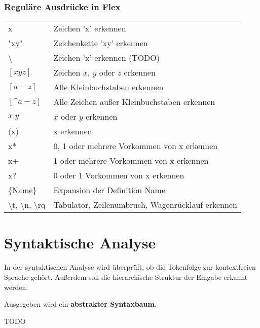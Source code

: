 \subsubsection{Reguläre Ausdrücke in Flex}
\begin{table}
    \begin{tabular}{ll}
    x          & Zeichen 'x' erkennen                             \\
    "xy"       & Zeichenkette 'xy' erkennen                       \\
    \textbackslash & Zeichen 'x' erkennen (TODO)                      \\
    $[xyz]$    & Zeichen $x$, $y$ oder $z$ erkennen         \\
    $[a-z]$    & Alle Kleinbuchstaben erkennen                    \\
    $[\^a-z]$  & Alle Zeichen außer Kleinbuchstaben erkennen      \\
    $x|y$      & $x$ oder $y$ erkennen                        \\
    (x)        & x erkennen                                       \\
    x*         & 0, 1 oder mehrere Vorkommen von x erkennen       \\
    x+         & 1 oder mehrere Vorkommen von x erkennen          \\
    x?         & 0 oder 1 Vorkommen von x erkennen                \\
    \{Name\}   & Expansion der Definition Name                    \\
    \textbackslash t, \textbackslash n, \textbackslash rq & Tabulator, Zeilenumbruch, Wagenrücklauf erkennen \\
    \end{tabular}
\end{table}



\section{Syntaktische Analyse}%
In der syntaktischen Analyse wird überprüft, ob die Tokenfolge zur 
kontextfreien Sprache gehört. Außerdem soll die 
hierarchische Struktur der Eingabe erkannt werden.

Ausgegeben wird ein \textbf{abstrakter Syntaxbaum}.

\begin{beispiel}
	TODO
\end{beispiel}

